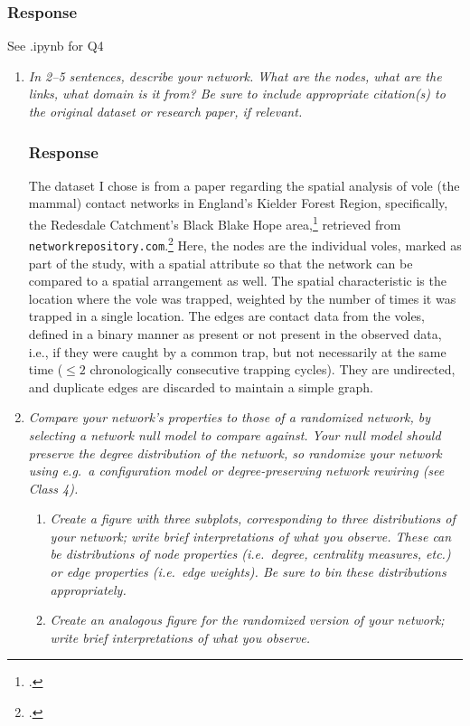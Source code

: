 \documentclass{article}
\newcommand{\response}{\subsubsection*{Response}}
\begin{document}
\response
    See .ipynb for Q4

\begin{enumerate}[label=(\alph*)]
    \item \textit{In 2--5 sentences, describe your network. What are the nodes, what are the links, what domain is it from? Be sure to include appropriate citation(s) to the original dataset or research paper, if relevant. }

\response
The dataset I chose is from a paper regarding the spatial analysis of vole (the mammal) contact networks in England's Kielder Forest Region, specifically, the Redesdale Catchment's Black Blake Hope area,\footcite{davis_spatial_2015} retrieved from \texttt{networkrepository.com}.\footcite{nr-aaai15} Here, the nodes are the individual voles, marked as part of the study, with a spatial attribute so that the network can be compared to a spatial arrangement as well. The spatial characteristic is the location where the vole was trapped, weighted by the number of times it was trapped in a single location. The edges are contact data from the voles, defined in a binary manner as present or not present in the observed data, i.e., if they were caught by a common trap, but not necessarily at the same time ($\le 2$ chronologically consecutive trapping cycles). They are undirected, and duplicate edges are discarded to maintain a simple graph. 

    \item \textit{Compare your network's properties to those of a randomized network, by selecting a network null model to compare against. Your null model should preserve the degree distribution of the network, so randomize your network using e.g.\ a configuration model or degree-preserving network rewiring (see Class 4).}
    \begin{enumerate}[label=\roman*.]
        \item \textit{Create a figure with three subplots, corresponding to three distributions of your network; write brief interpretations of what you observe. These can be distributions of node properties (i.e.\ degree, centrality measures, etc.) or edge properties (i.e.\ edge weights). Be sure to bin these distributions appropriately.}
        
        \item \textit{Create an analogous figure for the randomized version of your network; write brief interpretations of what you observe.}
    \end{enumerate}


\end{enumerate}
\end{document}
